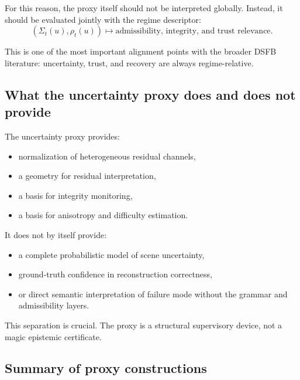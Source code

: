 \documentclass[11pt,letterpaper]{article}
\theoremstyle{gcresult}
\theoremstyle{definition}
\begin{document}
For this reason, the proxy itself should not be interpreted globally. Instead, it should be evaluated jointly with the regime descriptor:
\begin{equation}
(\Sigma_t(u),\rho_t(u)) \mapsto \text{admissibility, integrity, and trust relevance}.
\end{equation}

This is one of the most important alignment points with the broader DSFB literature: uncertainty, trust, and recovery are always regime-relative.


\subsection{What the uncertainty proxy does and does not provide}

The uncertainty proxy provides:
\begin{itemize}[leftmargin=1.5em]
    \item normalization of heterogeneous residual channels,
    \item a geometry for residual interpretation,
    \item a basis for integrity monitoring,
    \item a basis for anisotropy and difficulty estimation.
\end{itemize}

It does not by itself provide:
\begin{itemize}[leftmargin=1.5em]
    \item a complete probabilistic model of scene uncertainty,
    \item ground-truth confidence in reconstruction correctness,
    \item or direct semantic interpretation of failure mode without the grammar and admissibility layers.
\end{itemize}

This separation is crucial. The proxy is a structural supervisory device, not a magic epistemic certificate.


\subsection{Summary of proxy constructions}
\end{document}
